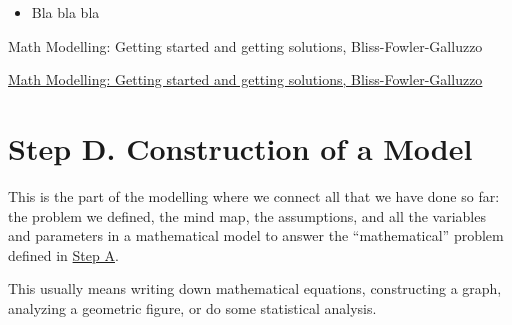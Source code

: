 \begin{module}
	
	\begin{itemize}
		\item Bla bla bla	
	\end{itemize}
	

\begin{annotation}
	\begin{goals}
	Math Modelling: Getting started and getting solutions, Bliss-Fowler-Galluzzo
	
	\hfill {}	
	\end{goals}
\end{annotation}
	 \href{https://m3challenge.siam.org/resources/modeling-handbook}{Math Modelling: Getting started and getting solutions, Bliss-Fowler-Galluzzo}
\end{module}









\section*{Step D. Construction of a Model}\label{model}


This is the part of the modelling where we connect all that we have done so far: the problem we defined, the mind map, the assumptions, and all the variables and parameters in a mathematical model to answer the ``mathematical'' problem defined in \hyperref[define]{Step A}.

This usually means writing down mathematical equations, constructing a graph, analyzing a geometric figure, or do some statistical analysis. \\



